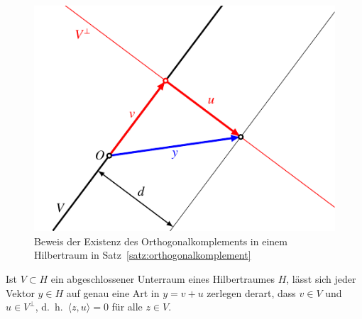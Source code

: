 \begin{figure}
\centering
\includegraphics{chapters/1-geometrie/images/orthogonalkomplement.pdf}
\caption{Beweis der Existenz des Orthogonalkomplements in einem Hilbertraum
in Satz~\ref{satz:orthogonalkomplement}
\label{figure:orthogonalkomplement}}
\end{figure}

\begin{satz}
\label{satz:orthogonalkomplement}
Ist $V\subset H$ ein abgeschlossener Unterraum eines Hilbertraumes $H$,
lässt sich jeder Vektor $y\in H$ auf genau eine Art in $y = v+u$
zerlegen derart, dass $v \in V$ und $u\in V^{\perp}$,
d.~h.~$\langle z,u\rangle=0$ für alle $z\in V$.
\end{satz}

